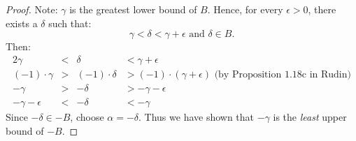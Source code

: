 \documentclass{amsart}
\begin{document}
\begin{enumerate}[1.]
\begin{proof}
Note: $\gamma$ is the greatest lower bound of $B$. Hence, for every
$\epsilon > 0$, there exists a $\delta$ such that:
\[
    \gamma < \delta < \gamma + \epsilon \text{ and } \delta\in B.
\]
Then:
\begin{alignat*}{2}
    \gamma &< &\delta &< \gamma + \epsilon \\
    (-1)\cdot\gamma &> &(-1)\cdot\delta &> (-1)\cdot(\gamma + \epsilon) \text{ (by Proposition 1.18c in Rudin)}\\
    -\gamma &> &-\delta &> -\gamma -\epsilon \\
    -\gamma -\epsilon &< &-\delta &< -\gamma
\end{alignat*}
Since $-\delta\in -B$, choose $\alpha = -\delta$. Thus we have shown that
$-\gamma$ is the \emph{least} upper bound of $-B$.
\end{proof}

\newpage

\end{enumerate}
\end{document}
